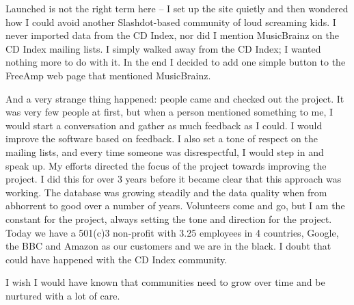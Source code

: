 Launched is not the right term here -- I set up the site quietly and then
wondered how I could avoid another Slashdot-based community of loud screaming
kids. I never imported data from the CD Index, nor did I mention MusicBrainz on
the CD Index mailing lists. I simply walked away from the CD Index; I wanted
nothing more to do with it. In the end I decided to add one simple button to the
FreeAmp web page that mentioned MusicBrainz.

And a very strange thing happened: people came and checked out the project. It
was very few people at first, but when a person mentioned something to me, I
would start a conversation and gather as much feedback as I could. I would
improve the software based on feedback. I also set a tone of respect on the
mailing lists, and every time someone was disrespectful, I would step in and
speak up. My efforts directed the focus of the project towards improving the
project. I did this for over 3 years before it became clear that this approach
was working. The database was growing steadily and the data quality when from
abhorrent to good over a number of years. Volunteers come and go, but I am the
constant for the project, always setting the tone and direction for the project.
Today we have a 501(c)3 non-profit with 3.25 employees in 4 countries, Google,
the BBC and Amazon as our customers and we are in the black. I doubt that could
have happened with the CD Index community.

I wish I would have known that communities need to grow over time and be
nurtured with a lot of care.

